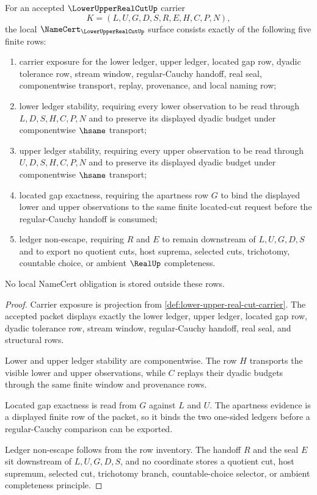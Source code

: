 \begin{theorem}
\label{thm:lower-upper-real-cut-namecert-obligations}
For an accepted $\LowerUpperRealCutUp$ carrier
$$
K=(L,U,G,D,S,R,E,H,C,P,N),
$$
the local $\NameCert_{\LowerUpperRealCutUp}$ surface consists exactly of the following five finite rows:
\begin{enumerate}
\item carrier exposure for the lower ledger, upper ledger, located gap row, dyadic tolerance row, stream window, regular-Cauchy handoff, real seal, componentwise transport, replay, provenance, and local naming row;
\item lower ledger stability, requiring every lower observation to be read through $L,D,S,H,C,P,N$ and to preserve its displayed dyadic budget under componentwise $\hsame$ transport;
\item upper ledger stability, requiring every upper observation to be read through $U,D,S,H,C,P,N$ and to preserve its displayed dyadic budget under componentwise $\hsame$ transport;
\item located gap exactness, requiring the apartness row $G$ to bind the displayed lower and upper observations to the same finite located-cut request before the regular-Cauchy handoff is consumed;
\item ledger non-escape, requiring $R$ and $E$ to remain downstream of $L,U,G,D,S$ and to export no quotient cuts, host suprema, selected cuts, trichotomy, countable choice, or ambient $\RealUp$ completeness.
\end{enumerate}
No local NameCert obligation is stored outside these rows.
\end{theorem}
\begin{proof}
Carrier exposure is projection from \autoref{def:lower-upper-real-cut-carrier}. The accepted packet displays exactly the lower ledger, upper ledger, located gap row, dyadic tolerance row, stream window, regular-Cauchy handoff, real seal, and structural rows.

Lower and upper ledger stability are componentwise. The row $H$ transports the visible lower and upper observations, while $C$ replays their dyadic budgets through the same finite window and provenance rows.

Located gap exactness is read from $G$ against $L$ and $U$. The apartness evidence is a displayed finite row of the packet, so it binds the two one-sided ledgers before a regular-Cauchy comparison can be exported.

Ledger non-escape follows from the row inventory. The handoff $R$ and the seal $E$ sit downstream of $L,U,G,D,S$, and no coordinate stores a quotient cut, host supremum, selected cut, trichotomy branch, countable-choice selector, or ambient completeness principle.
\end{proof}


